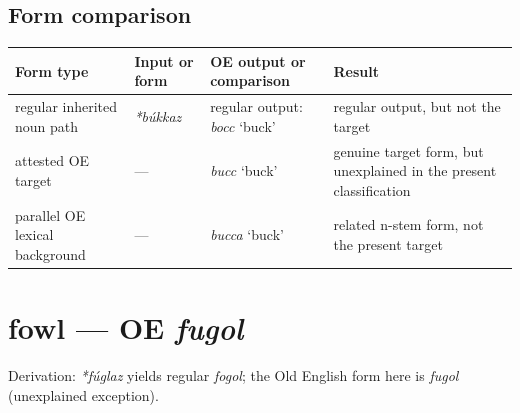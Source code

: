 \documentclass[
  british,
  a4paper,
  openany]{book}
\newcounter{none} %
\providecommand{\texorpdfstring}[2]{#1}
\begin{document}
\subsection{Form comparison}\label{form-comparison-7}

{\def\LTcaptype{none} %
\begin{longtable}[]{@{}
  >{\raggedright\arraybackslash}p{}
  >{\raggedright\arraybackslash}p{}
  >{\raggedright\arraybackslash}p{}
  >{\raggedright\arraybackslash}p{}@{}}
\toprule\noalign{}
\begin{minipage}[b]{\linewidth}\raggedright
Form type
\end{minipage} & \begin{minipage}[b]{\linewidth}\raggedright
Input or form
\end{minipage} & \begin{minipage}[b]{\linewidth}\raggedright
OE output or comparison
\end{minipage} & \begin{minipage}[b]{\linewidth}\raggedright
Result
\end{minipage} \\
\midrule\noalign{}
\endhead
\bottomrule\noalign{}
\endlastfoot
regular inherited noun path & {\emph{*búkkaz}} & regular output:
{\emph{bocc}} `buck' & regular output, but not the target \\
attested OE target & --- & {\emph{bucc}} `buck' & genuine target form,
but unexplained in the present classification \\
parallel OE lexical background & --- & {\emph{bucca}} `buck' & related
n-stem form, not the present target \\
\end{longtable}
}

\section{\texorpdfstring{fowl --- OE
\emph{fugol}}{fowl --- OE fugol}}\label{fowl-oe-fugol}


Derivation: \emph{*fúglaz} yields regular \emph{fogol}; the Old English
form here is \emph{fugol} (unexplained exception).
\end{document}

